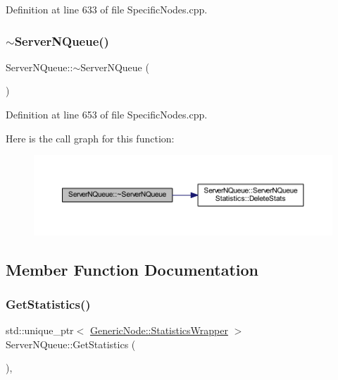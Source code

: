 Definition at line 633 of file Specific\+Nodes.\+cpp.

\mbox{\label{class_server_n_queue_ab13c0aee5829a612bf6bda12c82ad6b7}} 
\subsubsection{\texorpdfstring{$\sim$\+Server\+N\+Queue()}{~ServerNQueue()}}
{\footnotesize\ttfamily Server\+N\+Queue\+::$\sim$\+Server\+N\+Queue (\begin{DoxyParamCaption}{ }\end{DoxyParamCaption})}



Definition at line 653 of file Specific\+Nodes.\+cpp.

Here is the call graph for this function\+:\nopagebreak
\begin{figure}[H]
\begin{center}
\leavevmode
\includegraphics[width=350pt]{class_server_n_queue_ab13c0aee5829a612bf6bda12c82ad6b7_cgraph}
\end{center}
\end{figure}


\subsection{Member Function Documentation}
\mbox{\label{class_server_n_queue_a18718f3796f33fa0f9d9100c34a6a7dc}} 
\subsubsection{\texorpdfstring{Get\+Statistics()}{GetStatistics()}}
{\footnotesize\ttfamily std\+::unique\+\_\+ptr$<$ \hyperlink{class_generic_node_1_1_statistics_wrapper}{Generic\+Node\+::\+Statistics\+Wrapper} $>$ Server\+N\+Queue\+::\+Get\+Statistics (\begin{DoxyParamCaption}{ }\end{DoxyParamCaption})\hspace{0.3cm}{\ttfamily [override]}, {\ttfamily [virtual]}}



